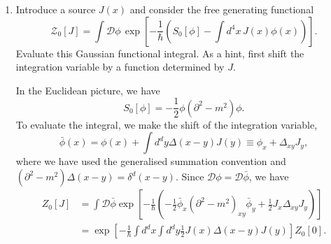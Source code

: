 \begin{enumerate}[label=\alph*)]
    \item Introduce a source $J(x)$ and consider the free generating functional
    \begin{equation}
        \mathcal Z_0[J]
        =\int\mathcal D\phi\,
        \exp\!\left[
            -\frac{1}{\hbar}
            \left(
                S_0[\phi]-\int d^4x\,J(x)\phi(x)
            \right)
        \right].
    \end{equation}
    Evaluate this Gaussian functional integral. As a hint, first shift the integration
    variable by a function determined by $J$.
    \begin{solution}
        In the Euclidean picture, we have
        \begin{equation}
            S_0[\phi] = -\frac{1}{2}\phi (\partial^2 - m^2)\phi.
        \end{equation}
        To evaluate the integral, we make the shift of the integration variable,
        \begin{equation}
            \bar \phi(x) = \phi(x) + \int d^dy \Delta(x-y)J(y) \equiv \phi_x + \Delta_{xy}J_y,
        \end{equation}
        where we have used the generalised summation convention and $(\partial^2 - m^2)\Delta(x-y) = \delta^d(x-y)$. Since $\mathcal{D}\phi = \mathcal{D}\bar \phi$, we have
        \begin{equation}
        \begin{aligned}
            Z_0[J] &= \int \mathcal{D}\bar \phi\exp\left[-\frac{1}{\hbar}\left(-\frac{1}{2}\bar \phi_x(\partial^2-m^2)_{xy}\bar \phi_y + \frac{1}{2}J_x\Delta_{xy}J_y\right)\right]  \\
            &=\exp\left[-\frac{1}{\hbar}\int d^dx\int d^dy \frac{1}{2}J(x)\Delta(x-y)J(y)\right]Z_0[0].
        \end{aligned}
        \end{equation}
    \end{solution}


\end{enumerate}
